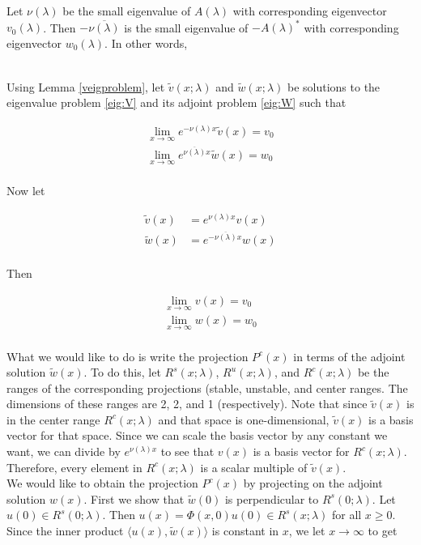 \documentclass[12pt]{article}
\begin{document}
Let $\nu(\lambda)$ be the small eigenvalue of $A(\lambda)$ with corresponding eigenvector $v_0(\lambda)$. Then $-\overline{\nu(\lambda)}$ is the small eigenvalue of $-A(\lambda)^*$ with corresponding eigenvector $w_0(\lambda)$. In other words,

\begin{align*}
\end{align*}

Using Lemma \ref{veigproblem}, let $\tilde{v}(x; \lambda)$ and $\tilde{w}(x; \lambda)$ be solutions to the eigenvalue problem \eqref{eig:V} and its adjoint problem \eqref{eig:W} such that

\begin{align*}
\lim_{x \rightarrow \infty} e^{-\nu(\lambda) x} \tilde{v}(x) = v_0 \\
\lim_{x \rightarrow \infty} e^{\overline{\nu(\lambda)} x} \tilde{w}(x) = w_0 \\
\end{align*}

Now let 

\begin{align*}
\tilde{v}(x) &= e^{\nu(\lambda) x } v(x) \\
\tilde{w}(x) &= e^{-\overline{\nu(\lambda)} x} w(x) \\
\end{align*}

Then

\begin{align*}
\lim_{x \rightarrow \infty} v(x) = v_0 \\
\lim_{x \rightarrow \infty} w(x) = w_0 \\
\end{align*}

What we would like to do is write the projection $P^c(x)$ in terms of the adjoint solution $\tilde{w}(x)$. To do this, let $R^s(x; \lambda)$, $R^u(x; \lambda)$, and $R^c(x; \lambda)$ be the ranges of the corresponding projections (stable, unstable, and center ranges. The dimensions of these ranges are 2, 2, and 1 (respectively). Note that since $\tilde{v}(x)$ is in the center range $R^c(x; \lambda)$ and that space is one-dimensional, $\tilde{v}(x)$ is a basis vector for that space. Since we can scale the basis vector by any constant we want, we can divide by $e^{\nu(\lambda) x }$ to see that $v(x)$ is a basis vector for $R^c(x; \lambda)$. Therefore, every element in $R^c(x; \lambda)$ is a scalar multiple of $\tilde{v}(x)$. \\

We would like to obtain the projection $P^c(x)$ by projecting on the adjoint solution $w(x)$. First we show that $\tilde{w}(0)$ is perpendicular to $R^s(0; \lambda)$. Let $u(0) \in R^s(0; \lambda)$. Then $u(x) = \Phi(x, 0)u(0) \in R^s(x; \lambda)$ for all $x \geq 0$. Since the inner product $\langle u(x), \tilde{w}(x) \rangle$ is constant in $x$, we let $x \rightarrow \infty$ to get
\end{document}

